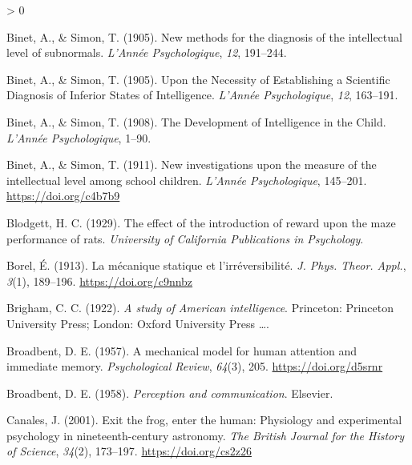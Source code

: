 \documentclass[
  oneside,
  12pt]{crumpbook}
\newlength{\cslhangindent}
\newenvironment{CSLReferences}[2] %
 {%
  \setlength{\parindent}{0pt}
  \ifodd #1 \everypar{\setlength{\hangindent}{\cslhangindent}}\ignorespaces\fi
  \ifnum #2 > 0
  \setlength{\parskip}{#2\baselineskip}
  \fi
 }%
 {}
\begin{document}
\begin{CSLReferences}{1}{0}
\leavevmode\hypertarget{ref-binetNewMethodsDiagnosis1905}{}%
Binet, A., \& Simon, T. (1905). New methods for the diagnosis of the intellectual level of subnormals. \emph{L'Année Psychologique}, \emph{12}, 191--244.

\leavevmode\hypertarget{ref-binetNecessityEstablishingScientific1905}{}%
Binet, A., \& Simon, T. (1905). Upon the {Necessity} of {Establishing} a {Scientific Diagnosis} of {Inferior States} of {Intelligence}. \emph{L'Année Psychologique}, \emph{12}, 163--191.

\leavevmode\hypertarget{ref-binetDevelopmentIntelligenceChild1908}{}%
Binet, A., \& Simon, T. (1908). The {Development} of {Intelligence} in the {Child}. \emph{L'Année Psychologique}, 1--90.

\leavevmode\hypertarget{ref-binetNewInvestigationsMeasure1911}{}%
Binet, A., \& Simon, T. (1911). New investigations upon the measure of the intellectual level among school children. \emph{L'Année Psychologique}, 145--201. \url{https://doi.org/c4b7b9}

\leavevmode\hypertarget{ref-blodgettEffectIntroductionReward1929}{}%
Blodgett, H. C. (1929). The effect of the introduction of reward upon the maze performance of rats. \emph{University of California Publications in Psychology}.

\leavevmode\hypertarget{ref-borelMecaniqueStatiqueIrreversibilite1913}{}%
Borel, É. (1913). La mécanique statique et l'irréversibilité. \emph{J. Phys. Theor. Appl.}, \emph{3}(1), 189--196. \url{https://doi.org/c9nnbz}

\leavevmode\hypertarget{ref-brighamStudyAmericanIntelligence1922}{}%
Brigham, C. C. (1922). \emph{A study of {American} intelligence}. {Princeton: Princeton University Press; London: Oxford University Press \ldots{}}.

\leavevmode\hypertarget{ref-broadbentMechanicalModelHuman1957}{}%
Broadbent, D. E. (1957). A mechanical model for human attention and immediate memory. \emph{Psychological Review}, \emph{64}(3), 205. \url{https://doi.org/d5srnr}

\leavevmode\hypertarget{ref-broadbentPerceptionCommunication1958}{}%
Broadbent, D. E. (1958). \emph{Perception and communication}. {Elsevier}.

\leavevmode\hypertarget{ref-canalesExitFrogEnter2001}{}%
Canales, J. (2001). Exit the frog, enter the human: Physiology and experimental psychology in nineteenth-century astronomy. \emph{The British Journal for the History of Science}, \emph{34}(2), 173--197. \url{https://doi.org/cs2z26}


\end{CSLReferences}
\end{document}
